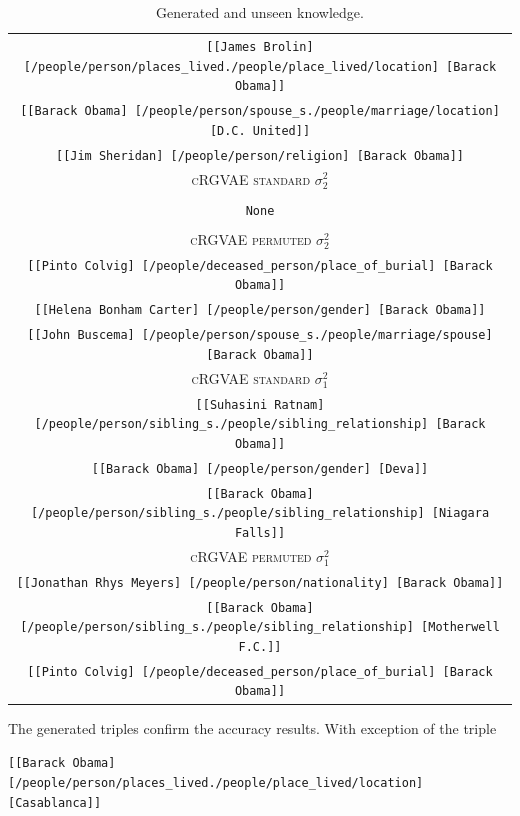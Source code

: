 \begin{table}[H]
\begin{tabular}{|c|}
  \texttt{[[James Brolin]	[/people/person/places\_lived./people/place\_lived/location]	[Barack Obama]]}\\
  \texttt{[[Barack Obama]	[/people/person/spouse\_s./people/marriage/location]	[D.C. United]]}\\
  \texttt{[[Jim Sheridan]	[/people/person/religion]	[Barack Obama]]}\\ \hline
  \rowcolor[HTML]{EFEFEF} 
  \textsc{cRGVAE standard} $\sigma_2^2$\\ \hline
  \texttt{}\\
  \texttt{None}\\
  \texttt{}\\ \hline
  \rowcolor[HTML]{EFEFEF} 
  \textsc{cRGVAE permuted} $\sigma_2^2$\\ \hline
  \texttt{[[Pinto Colvig]	[/people/deceased\_person/place\_of\_burial]	[Barack Obama]]}\\
  \texttt{[[Helena Bonham Carter]	[/people/person/gender]	[Barack Obama]]}\\
  \texttt{[[John Buscema]	[/people/person/spouse\_s./people/marriage/spouse]	[Barack Obama]]}\\ \hline
  \rowcolor[HTML]{EFEFEF} 
  \textsc{cRGVAE standard} $\sigma_1^2$\\ \hline
  \texttt{[[Suhasini Ratnam]	[/people/person/sibling\_s./people/sibling\_relationship]	[Barack Obama]]}\\
  \texttt{[[Barack Obama]	[/people/person/gender]	[Deva]]}\\
  \texttt{[[Barack Obama]	[/people/person/sibling\_s./people/sibling\_relationship]	[Niagara Falls]]}\\ \hline
  \rowcolor[HTML]{EFEFEF} 
  \textsc{cRGVAE permuted} $\sigma_1^2$\\ \hline
  \texttt{[[Jonathan Rhys Meyers]	[/people/person/nationality]	[Barack Obama]]}\\
  \texttt{[[Barack Obama]	[/people/person/sibling\_s./people/sibling\_relationship]	[Motherwell F.C.]]}\\
  \texttt{[[Pinto Colvig]	[/people/deceased\_person/place\_of\_burial]	[Barack Obama]]}\\ \hline
  \end{tabular}
\caption{Generated and unseen knowledge.}
\label{tab5:genTriples}
\end{table}


The generated triples confirm the accuracy results. With exception of the triple 
\begin{center}
  \texttt{[[Barack Obama]	[/people/person/places\_lived./people/place\_lived/location]	[Casablanca]]} 
\end{center}

